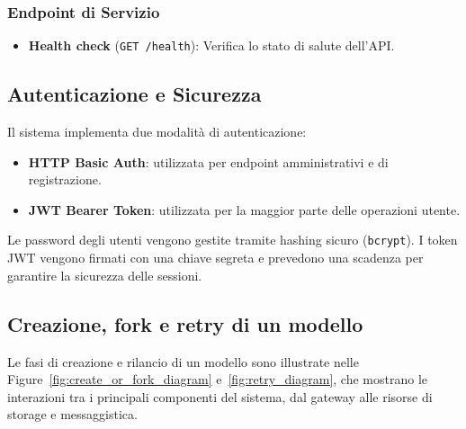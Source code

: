 \subsubsection{Endpoint di Servizio}

\begin{itemize}
	\item \textbf{Health check} (\texttt{GET /health}): Verifica lo stato di salute dell’API.
\end{itemize}

\subsection{Autenticazione e Sicurezza}

Il sistema implementa due modalità di autenticazione:
\begin{itemize}
	\item \textbf{HTTP Basic Auth}: utilizzata per endpoint amministrativi e di registrazione.
	\item \textbf{JWT Bearer Token}: utilizzata per la maggior parte delle operazioni utente.
\end{itemize}

Le password degli utenti vengono gestite tramite hashing sicuro (\texttt{bcrypt}). I token JWT vengono firmati con una chiave segreta e prevedono una scadenza per garantire la sicurezza delle sessioni.

\subsection{Creazione, fork e retry di un modello}
Le fasi di creazione e rilancio di un modello sono illustrate nelle Figure~\ref{fig:create_or_fork_diagram} e~\ref{fig:retry_diagram}, che mostrano le interazioni tra i principali componenti del sistema, dal gateway alle risorse di storage e messaggistica.

